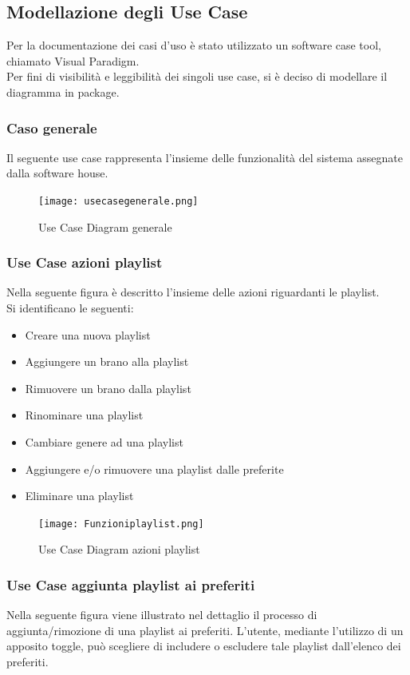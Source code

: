 \documentclass{article}
\begin{document}
		\subsection{Modellazione degli Use Case}
		Per la documentazione dei casi d'uso è stato utilizzato un software case tool, chiamato Visual Paradigm.\\
		Per fini di visibilità e leggibilità dei singoli use case, si è deciso di modellare il diagramma in package.
			\subsubsection{Caso generale}
			Il seguente use case rappresenta l'insieme delle funzionalità del sistema assegnate dalla software house.
				\begin{figure}[H]
					\centering
					\texttt{[image: usecasegenerale.png]}
					\caption{Use Case Diagram generale}
				\end{figure}
				
			\subsubsection{Use Case azioni playlist}
			Nella seguente figura è descritto l'insieme delle azioni riguardanti le playlist.\\
			Si identificano le seguenti:
			\begin{itemize}
				\item Creare una nuova playlist
				\item Aggiungere un brano alla playlist
				\item Rimuovere un brano dalla playlist
				\item Rinominare una playlist
				\item Cambiare genere ad una playlist
				\item Aggiungere e/o rimuovere una playlist dalle preferite
				\item Eliminare una playlist
			\end{itemize}
			
			\begin{figure}[H]
				\centering
				\texttt{[image: Funzioniplaylist.png]}
				\caption{Use Case Diagram azioni playlist}
			\end{figure}
			\subsubsection{Use Case aggiunta playlist ai preferiti}
			Nella seguente figura viene illustrato nel dettaglio il processo di aggiunta/rimozione di una playlist ai preferiti. L'utente, mediante l'utilizzo di un apposito toggle, può scegliere di includere o escludere tale playlist dall'elenco dei preferiti.
			
\end{document}
